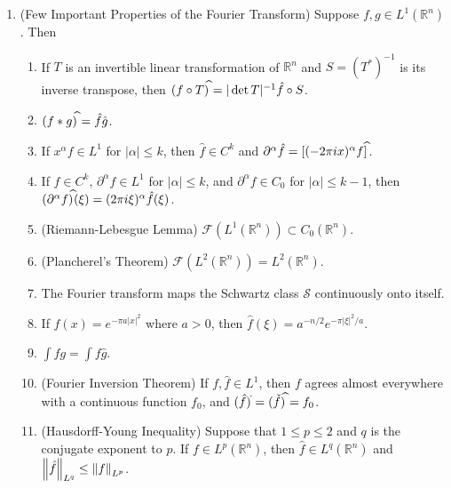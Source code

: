 \documentclass{article}
\begin{document}
\begin{enumerate}[resume=real_analysis]
		\item (Few Important Properties of the Fourier Transform) Suppose $f, g \in L^{1}(\mathbb{R}^{n})$. Then \vspace{-0.25cm}
		\begin{enumerate}[itemsep =-2pt,label = (\arabic{*})]
			\item If $T$ is an invertible linear transformation of $\mathbb{R}^{n}$ and $S = (T^\ast)^{-1}$ is its inverse transpose, then $(f \circ T)^{\widehat{}} = |\det{T}|^{-1} \hat{f} \circ S$. 
			\item $(f \ast g)^{\widehat{}} = \hat{f}\hat{g}$. 
			\item If $x^{\alpha}f \in L^{1}$ for $|\alpha|\leq k$, then $\hat{f} \in C^{k}$ and $\partial^{\alpha}\hat{f} = [(-2\pi i x)^{\alpha}f]^{\widehat{}}$. 
			\item If $f \in C^{k}$, $\partial^{\alpha}f \in L^{1}$ for $|\alpha| \leq k$, and $\partial^{\alpha}f \in C_{0}$ for $|\alpha| \leq k- 1$, then $(\partial^{\alpha}f)^{\widehat{}}(\xi) = (2\pi i \xi)^{\alpha}\hat{f}(\xi)$. 
			\item (Riemann-Lebesgue Lemma) $\mathscr{F}(L^{1}(\mathbb{R}^{n})) \subset C_{0}(\mathbb{R}^{n})$. 
			\item (Plancherel's Theorem) $\mathscr{F}(L^{2}(\mathbb{R}^{n})) = L^{2}(\mathbb{R}^{n})$. 
			\item The Fourier transform maps the Schwartz class $\mathscr{S}$ continuously onto itself. 
			\item If $f(x)= e^{-\pi a |x|^{2}}$ where $a > 0$, then $\hat{f}(\xi) = a^{-n/2}e^{-\pi |\xi|^{2}/a}$. 
			\item $\int \hat{f}g = \int f \hat{g}$. 
			\item (Fourier Inversion Theorem) If $f, \hat{f} \in L^{1}$, then $f$ agrees almost everywhere with a continuous function $f_{0}$, and $(\hat{f})^{\check{}} = (\check{f})^{\widehat{}} = f_{0}$. 
			\item (Hausdorff-Young Inequality) Suppose that $1 \leq p \leq 2$ and $q$ is the conjugate exponent to $p$. If $f \in L^{p}(\mathbb{R}^{n})$, then $\hat{f} \in L^{q}(\mathbb{R}^{n})$ and $\left\Vert \hat{f} \right\Vert_{L^q} \leq \left\Vert f \right\Vert_{L^{p}}$. 
		\end{enumerate}
		\end{enumerate}
	
\end{document}
